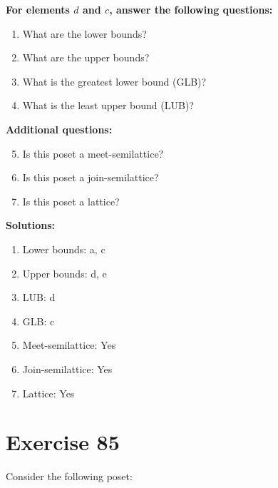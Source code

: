 \documentclass{article}
\begin{document}
    \textbf{For elements $d$ and $c$, answer the following questions:}
\begin{enumerate}
    \item What are the lower bounds?
    \item What are the upper bounds?
    \item What is the greatest lower bound (GLB)?
    \item What is the least upper bound (LUB)?
\end{enumerate}
    \hspace*{3ex} \textbf{Additional questions:}
\begin{enumerate}
    \setcounter{enumi}{4}
    \item Is this poset a meet-semilattice?
    \item Is this poset a join-semilattice?
    \item Is this poset a lattice?
\end{enumerate}

\textbf{Solutions:}
\begin{enumerate}
    \item Lower bounds: {a, c}
    \item Upper bounds: {d, e}
    \item LUB: d
    \item GLB: c
    \item Meet-semilattice: Yes
    \item Join-semilattice: Yes
    \item Lattice: Yes
\end{enumerate}
\newpage
\section*{Exercise 85}
Consider the following poset:
\begin{center}
\end{center}
\end{document}
